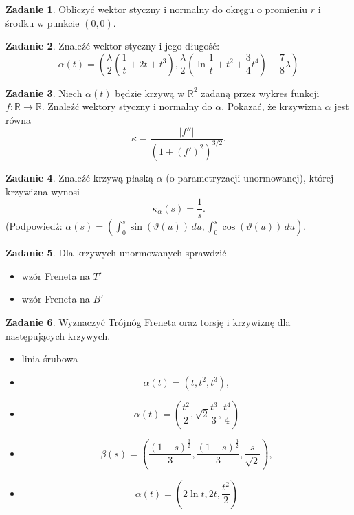 \documentclass[a4paper,11pt]{article}
\theoremstyle{definition}\newtheorem{exercise}{Zadanie}
\theoremstyle{definition}\newtheorem{remark}{Uwaga}
\begin{document}
\begin{exercise}
Obliczyć wektor styczny i normalny do okręgu o promieniu $r$ i środku w 
punkcie $(0,0)$.
\end{exercise}

\begin{exercise}
Znaleźć wektor styczny i jego długość:
\[\alpha(t)=\left(\frac{\lambda}{2}\left(\frac{1}{t}+2t+t^3\right),\frac{\lambda
}{2}\left(\ln 
{\frac{1}{t}}+t^2+\frac{3}{4}t^4\right)-\frac{7}{8}\lambda\right)\]
\end{exercise}

\begin{exercise}
 Niech $\alpha(t)$ będzie krzywą w $\mathbb{R}^2$ zadaną przez wykres funkcji 
$f\colon 
\mathbb{R}\to \mathbb{R}$. Znaleźć wektory styczny i normalny do $\alpha$. 
Pokazać, że krzywizna $\alpha$ jest r\'owna
\[\kappa=\frac{|f''|}{(1+(f')^2)^{3/2}}.\] 
\end{exercise}

\begin{exercise}
Znaleźć krzywą płaską $\alpha$ (o parametryzacji unormowanej), której krzywizna 
wynosi \[\kappa_\alpha(s)=\frac{1}{s}.\]
\footnotesize{(Podpowiedź: 
$\alpha(s)=(\int_0^s\sin(\vartheta(u))\,du,\int_0^s\cos(\vartheta(u))\,du)$.}
\end{exercise}

\begin{exercise}
Dla krzywych unormowanych sprawdzić 
\begin{itemize}
 \item wz\'or Freneta na $T'$ 
 \item wz\'or Freneta na $B'$ 
\end{itemize}

\end{exercise}

\begin{exercise}
Wyznaczyć Tr\'ojn\'og Freneta oraz torsję i krzywiznę dla następujących 
krzywych.
\begin{itemize}
 \item linia śrubowa
\item 
\[\alpha(t)=(t,t^2,t^3),\]
\item 
\[\alpha(t)=\left(\frac{t^2}{2},\sqrt{2}\frac{t^3}{3},\frac{t^4}{4}\right)\]
\item 
\[\beta(s)=\left(\frac{(1+s)^{\frac{3}{2}}}{3},\frac{(1-s)^{\frac{3}
{ 2}}}{3},
\frac{s}{\sqrt{2}}\right),\]
\item \[\alpha(t)=\left(2\ln t,2t,\frac{t^2}{2}\right)\]

\end{itemize}

\end{exercise}
\end{document}
